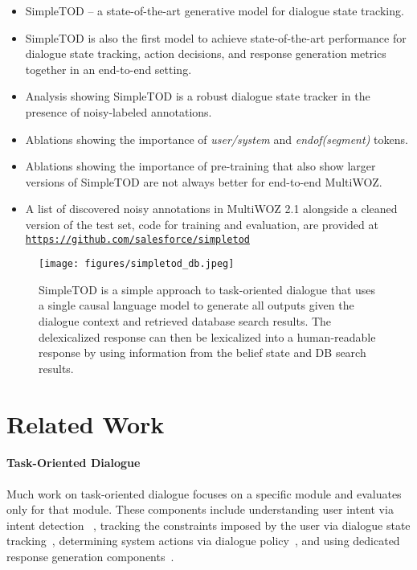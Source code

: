 \documentclass{article}
\begin{document}
\begin{itemize}



\item SimpleTOD --  a state-of-the-art generative model for dialogue state tracking. 
\item SimpleTOD is also the first model to achieve state-of-the-art performance for dialogue state tracking, action decisions, and response generation metrics together in an end-to-end setting. 
\item Analysis showing SimpleTOD is a robust dialogue state tracker in the presence of noisy-labeled annotations. 
\item Ablations showing the importance of \textit{user/system} and \textit{endof(segment)} tokens.
\item Ablations showing the importance of pre-training that also show larger versions of SimpleTOD are not always better for end-to-end MultiWOZ.
\item A list of discovered noisy annotations in MultiWOZ 2.1 alongside a cleaned version of the test set, code for training and evaluation, are 
provided at \texttt{\url{https://github.com/salesforce/simpletod}}
\end{itemize}

\begin{figure*}[t!]
\centering
\texttt{[image: figures/simpletod\_db.jpeg]}


  \caption{SimpleTOD is a simple approach to task-oriented dialogue that uses a single causal language model to generate all outputs given the dialogue context and retrieved database search results. 
  The delexicalized response can then be lexicalized into a human-readable response by using information from the belief state and DB search results.}
  \label{fig:model}
\end{figure*}

\section{Related Work}
\label{sec:related-works}

\paragraph{Task-Oriented Dialogue}
Much work on task-oriented dialogue focuses on a specific module and evaluates only for that module. 
These components include understanding user intent via intent detection ~\citep{liu2016attentionbasedrnn}, 
tracking the constraints imposed by the user via dialogue state tracking~\citep{henderson2013deep, mrksic2017neuralbelief, rastogi2017scalable, nouri2018toward, trade2019wu, zhang2019find, zhou2019multi, schema2020chen, heck2020trippy}, 
determining system actions via dialogue policy~\citep{wen2017action}, 
and using dedicated response generation components~\citep{wen2015sclstm}.
\end{document}
